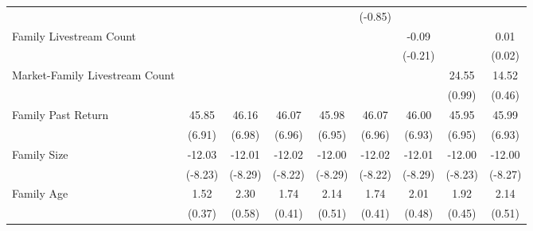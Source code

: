 {\begin{tabular}{l*{8}{c}}
                    &                     &                     &                     &                     &     (-0.85)         &                     &                     &                     \\
\addlinespace
Family Livestream Count&                     &                     &                     &                     &                     &       -0.09         &                     &        0.01         \\
                    &                     &                     &                     &                     &                     &     (-0.21)         &                     &      (0.02)         \\
\addlinespace
Market-Family Livestream Count&                     &                     &                     &                     &                     &                     &       24.55         &       14.52         \\
                    &                     &                     &                     &                     &                     &                     &      (0.99)         &      (0.46)         \\
\addlinespace
Family Past Return  &       45.85\sym{***}&       46.16\sym{***}&       46.07\sym{***}&       45.98\sym{***}&       46.07\sym{***}&       46.00\sym{***}&       45.95\sym{***}&       45.99\sym{***}\\
                    &      (6.91)         &      (6.98)         &      (6.96)         &      (6.95)         &      (6.96)         &      (6.93)         &      (6.95)         &      (6.93)         \\
\addlinespace
Family Size         &      -12.03\sym{***}&      -12.01\sym{***}&      -12.02\sym{***}&      -12.00\sym{***}&      -12.02\sym{***}&      -12.01\sym{***}&      -12.00\sym{***}&      -12.00\sym{***}\\
                    &     (-8.23)         &     (-8.29)         &     (-8.22)         &     (-8.29)         &     (-8.22)         &     (-8.29)         &     (-8.23)         &     (-8.27)         \\
\addlinespace
Family Age          &        1.52         &        2.30         &        1.74         &        2.14         &        1.74         &        2.01         &        1.92         &        2.14         \\
                    &      (0.37)         &      (0.58)         &      (0.41)         &      (0.51)         &      (0.41)         &      (0.48)         &      (0.45)         &      (0.51)         \\

\end{tabular}}
